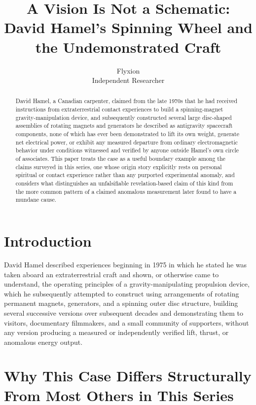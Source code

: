 \documentclass[11pt]{article}
\title{A Vision Is Not a Schematic: David Hamel's Spinning Wheel and the Undemonstrated Craft}
\author{Flyxion \\ \small Independent Researcher}
\date{}
\begin{document}
\maketitle

\begin{abstract}
David Hamel, a Canadian carpenter, claimed from the late 1970s that he had received instructions from extraterrestrial contact experiences to build a spinning-magnet gravity-manipulation device, and subsequently constructed several large disc-shaped assemblies of rotating magnets and generators he described as antigravity spacecraft components, none of which has ever been demonstrated to lift its own weight, generate net electrical power, or exhibit any measured departure from ordinary electromagnetic behavior under conditions witnessed and verified by anyone outside Hamel's own circle of associates. This paper treats the case as a useful boundary example among the claims surveyed in this series, one whose origin story explicitly rests on personal spiritual or contact experience rather than any purported experimental anomaly, and considers what distinguishes an unfalsifiable revelation-based claim of this kind from the more common pattern of a claimed anomalous measurement later found to have a mundane cause.
\end{abstract}

\section{Introduction}

David Hamel described experiences beginning in 1975 in which he stated he was taken aboard an extraterrestrial craft and shown, or otherwise came to understand, the operating principles of a gravity-manipulating propulsion device, which he subsequently attempted to construct using arrangements of rotating permanent magnets, generators, and a spinning outer disc structure, building several successive versions over subsequent decades and demonstrating them to visitors, documentary filmmakers, and a small community of supporters, without any version producing a measured or independently verified lift, thrust, or anomalous energy output.

\section{Why This Case Differs Structurally From Most Others in This Series}
\end{document}
